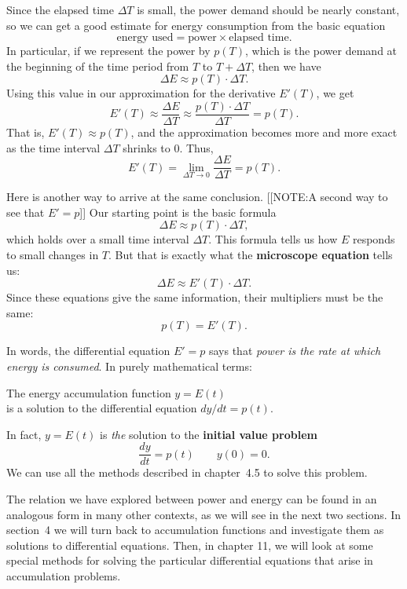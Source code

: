 	Since the elapsed time $\Delta T$ is small, the power demand should be nearly constant, so we can get a good estimate for energy consumption from the basic equation
	\[
\mbox{energy used} = \mbox{power} \times 
		\mbox{elapsed time}.
\]
In particular, if we represent the power by $p(T)$, which is the power demand at the beginning of the time period from $T$ to $T + \Delta T$, then we have
	\[
\Delta E \approx p(T) \cdot \Delta T.
\]
Using this value in our approximation for the derivative $E'(T)$, we get 
	\[
E'(T) \approx \dfrac{\Delta E}{\Delta T} \approx
		\dfrac{p(T) \cdot \Delta T}{\Delta T} = p(T).
\]
That is, $E'(T) \approx p(T)$, and the approximation becomes more and more exact as the time interval $\Delta T$ shrinks to 0.  Thus, 
	\[
E'(T) = \lim_{\Delta T \to 0} \dfrac{\Delta E}{\Delta T}
		= p(T).
\]

Here is another way to arrive at the same conclusion.  
[[NOTE:A second way  to see that $E' = p$]]
Our starting point is the basic formula
	\[
\Delta E \approx p(T) \cdot \Delta T,
\]
which holds over a small time interval $\Delta T$.  This formula tells us how $E$ responds to small changes in $T$.  But that is exactly what the {\bf microscope equation} tells us:
	\[
\Delta E \approx E'(T) \cdot \Delta T.
\]
Since these equations give the same information, their multipliers must be the same:
	\[
p(T) = E'(T).
\]

	In words, the differential equation $E' = p$ says that {\em power is the rate at which energy is consumed}.  In purely mathematical terms:
\begin{observation}
The energy accumulation function $y = E(t)$ \\
is a solution to the differential equation 
		$dy/dt = p(t)$.
\end{observation}
In fact, $y = E(t)$ is {\em the\/} solution to the {\bf initial value problem}
	\[
\dfrac{dy}{dt} = p(t) \qquad y(0) = 0.
\]
We can use all the methods described in chapter~4.5 to solve this problem.

The relation we have explored between power and energy can be found in
an analogous form in many other contexts, as we will see in the next
two sections.  In section~4 we will turn back to accumulation
functions and investigate them as solutions to differential equations.
Then, in chapter 11, we will look at some special methods for solving
the particular differential equations that arise in accumulation
problems.


